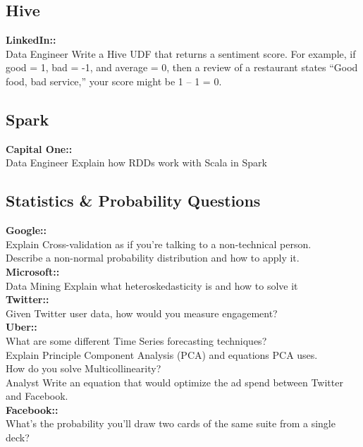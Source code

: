 \documentclass[11pt]{article}
\begin{document}
\subsection{Hive}
{\bf LinkedIn:: }\\
Data Engineer Write a Hive UDF that returns a sentiment score. For example, if good = 1, bad = -1, and average = 0, then a review of a restaurant states “Good food, bad service,” your score might be 1 – 1 = 0. \\


\subsection{Spark}
{\bf Capital One:: }\\
Data Engineer Explain how RDDs work with Scala in Spark \\


\subsection{Statistics \& Probability Questions}
{\bf Google:: }\\
Explain Cross-validation as if you’re talking to a non-technical person.\\
Describe a non-normal probability distribution and how to apply it.\\

{\bf Microsoft:: }\\
Data Mining Explain what heteroskedasticity is and how to solve it\\

{\bf Twitter:: }\\
Given Twitter user data, how would you measure engagement?\\

{\bf Uber:: }\\
What are some different Time Series forecasting techniques? \\
Explain Principle Component Analysis (PCA) and equations PCA uses.\\
How do you solve Multicollinearity? \\
Analyst Write an equation that would optimize the ad spend between Twitter and Facebook.\\

{\bf Facebook:: }\\
What’s the probability you’ll draw two cards of the same suite from a single deck?\\
\end{document}
